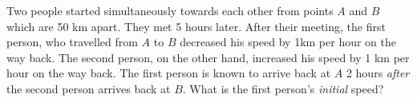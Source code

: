 
%
%
%
%
% 
% 

\question Two people started simultaneously towards each other from points $A$ and $B$ which 
are 50 km apart. They met 5 hours later. After their meeting, the first person, who travelled 
from $A$ to $B$ decreased his speed by 1km per hour on the way back. The second person, 
on the other hand, increased his speed by 1 km per hour on the way back. The first person 
is known to arrive back at $A$ 2 hours \textit{after} the second person arrives back at $B$. What is 
the first person's \textit{initial} speed?

\insertQR{}

\ifprintanswers
\fi 

